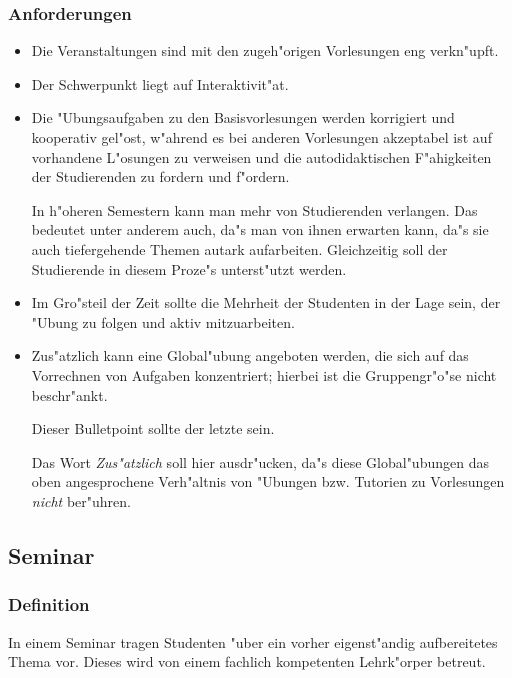 \subsubsection{Anforderungen}

\begin{itemize}
	\item Die Veranstaltungen sind mit den zugeh"origen Vorlesungen eng verkn"upft.
	\item Der Schwerpunkt liegt auf Interaktivit"at.
	\item Die "Ubungsaufgaben zu den Basisvorlesungen werden korrigiert und kooperativ gel"ost, w"ahrend es bei anderen
		Vorlesungen akzeptabel ist auf vorhandene L"osungen zu verweisen und die autodidaktischen F"ahigkeiten
		der Studierenden zu fordern und f"ordern.
\begin{kcmt}\begin{komacmt}
	In h"oheren Semestern kann man mehr von Studierenden verlangen. Das bedeutet unter anderem
	auch, da"s man von ihnen erwarten kann, da"s sie auch tiefergehende Themen autark aufarbeiten.
	Gleichzeitig soll der Studierende in diesem Proze"s unterst"utzt werden.
\end{komacmt}\end{kcmt}
	\item Im Gro"steil der Zeit sollte die Mehrheit der Studenten in der Lage sein, der "Ubung zu folgen und aktiv mitzuarbeiten.
	\item Zus"atzlich kann eine Global"ubung angeboten werden, die sich auf das Vorrechnen von Aufgaben konzentriert;
		hierbei ist die Gruppengr"o"se nicht beschr"ankt.
\begin{kcmt}\begin{komacmt}
	Dieser Bulletpoint sollte der letzte sein.

	Das Wort \emph{Zus"atzlich} soll hier ausdr"ucken, da"s diese Global"ubungen das oben
	angesprochene Verh"altnis von "Ubungen bzw. Tutorien zu Vorlesungen \emph{nicht} ber"uhren.
\end{komacmt}\end{kcmt}
	
\end{itemize}

\subsection{Seminar}

\subsubsection{Definition} 
	In einem Seminar tragen Studenten "uber ein vorher eigenst"andig aufbereitetes Thema vor. Dieses wird
	von einem fachlich kompetenten Lehrk"orper betreut.

